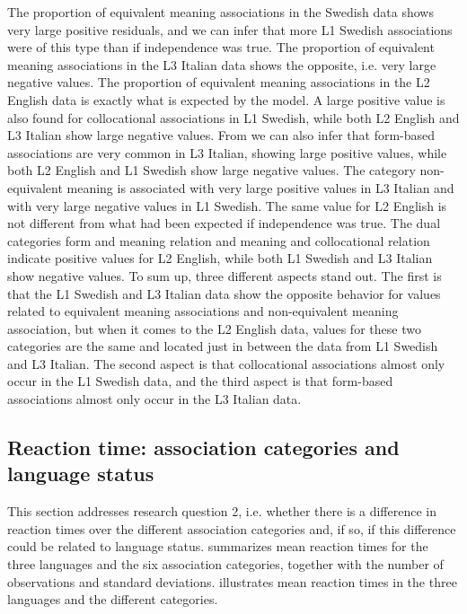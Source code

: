 \documentclass[output=paper,colorlinks,citecolor=brown,nonflat]{langsci/langscibook}
\begin{document}
The proportion of equivalent meaning associations in the Swedish data shows very large positive residuals, and we can infer that more L1 Swedish associations were of this type than if independence was true. The proportion of equivalent meaning associations in the L3 Italian data shows the opposite, i.e. very large negative values. The proportion of equivalent meaning associations in the L2 English data is exactly what is expected by the model. A large positive value is also found for collocational associations in L1 Swedish, while both L2 English and L3 Italian show large negative values. From  we can also infer that form-based associations are very common in L3 Italian, showing large positive values, while both L2 English and L1 Swedish show large negative values. The category non-equivalent meaning is associated with very large positive values in L3 Italian and with very large negative values in L1 Swedish. The same value for L2 English is not different from what had been expected if independence was true. The dual categories form and meaning relation and meaning and collocational relation indicate positive values for L2 English, while both L1 Swedish and L3 Italian show negative values. To sum up, three different aspects stand out. The first is that the L1 Swedish and L3 Italian data show the opposite behavior for values related to equivalent meaning associations and non-equivalent meaning association, but when it comes to the L2 English data, values for these two categories are the same and located just in between the data from L1 Swedish and L3 Italian. The second aspect is that collocational associations almost only occur in the L1 Swedish data, and the third aspect is that form-based associations almost only occur in the L3 Italian data.

\subsection{Reaction time: association categories and language status}\label{sec:gudmundson:3.2}

This section addresses research question 2, i.e. whether there is a difference in reaction times over the different association categories and, if so, if this difference could be related to language status.  summarizes mean reaction times for the three languages and the six association categories, together with the number of observations and standard deviations.  illustrates mean reaction times in the three languages and the different categories.
\end{document}
